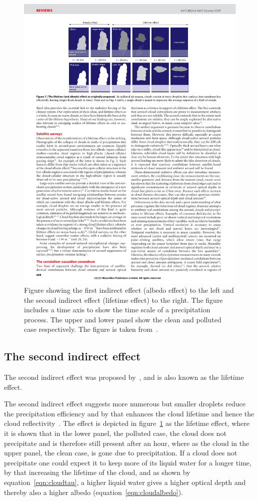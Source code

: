 \begin{figure}
\centering
\includegraphics[width=1.1\textwidth]{theory/indirecteffects.pdf}
\caption{Figure showing the first indirect effect (albedo effect) to the left and the second indirect effect (lifetime effect) to the right. The figure includes a time axis to show the time scale of a precipitation process. The upper and lower panel show the clean and polluted case respectively. The figure is taken from~\cite{Stevens2009}.}
\label{fig:indirecteffects}
\end{figure}

\subsection{The second indirect effect}
The second indirect effect was proposed by~\citet{Albrecht1989}, and is also known as the lifetime effect.

The second indirect effect suggests more numerous but smaller droplets reduce the precipitation efficiency and by that enhances the cloud lifetime and hence the cloud reflectivity~\citep{Albrecht1989}. The effect is depicted in figure~\ref{fig:indirecteffects} as the lifetime effect, where it is shown that in the lower panel, the polluted case, the cloud does not precipitate and is therefore still present after an hour, where as the cloud in the upper panel, the clean case, is gone due to precipitation. If a cloud does not precipitate one could expect it to keep more of its liquid water for a longer time, by that increasing the lifetime of the cloud, and as shown by equation~\ref{eqn:cloudtau}, a higher liquid water gives a higher optical depth and thereby also a higher albedo (equation~\ref{eqn:cloudalbedo}).

